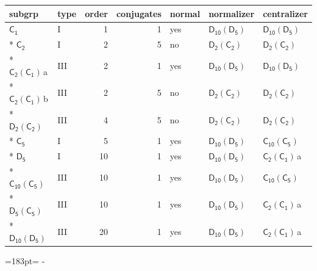 \documentclass[10pt,a4paper]{article}
\newcommand{\needspace}[1]{\par\penalty-100\begingroup\dimen0=#1\relax\dimen2=\pagegoal
  \advance\dimen2-\pagetotal\ifdim\dimen0>\dimen2\relax\ifdim\dimen2>0pt\vfil\break\fi\fi
  \endgroup}
\numberwithin{equation}{section}
\newcommand{\grp}[1]{\mathsf{#1}}
\newcommand{\clsletter}[1]{\,{\scriptsize\color{black!55}#1}}
\begin{document}
{\small\begin{longtable}{@{}llrrlll@{}}\toprule
subgrp & type & order & conjugates & normal & normalizer & centralizer\\\midrule\endhead
\bottomrule\endfoot\endlastfoot
\href{../../../rotation/data/pdf/C1.pdf}{$\grp{C_{1}}$} & I & 1 & 1 & yes & \href{D10-D5.pdf}{$\grp{D_{10}}(\grp{D_{5}})$} & \href{D10-D5.pdf}{$\grp{D_{10}}(\grp{D_{5}})$}\\*
\href{../../../rotation/data/pdf/C2.pdf}{$\grp{C_{2}}$} & I & 2 & 5 & no & \href{D2-C2.pdf}{$\grp{D_{2}}(\grp{C_{2}})$} & \href{D2-C2.pdf}{$\grp{D_{2}}(\grp{C_{2}})$}\\*
\href{C2-C1.pdf}{$\grp{C_{2}}(\grp{C_{1}})$}\clsletter{a} & III & 2 & 1 & yes & \href{D10-D5.pdf}{$\grp{D_{10}}(\grp{D_{5}})$} & \href{D10-D5.pdf}{$\grp{D_{10}}(\grp{D_{5}})$}\\*
\href{C2-C1.pdf}{$\grp{C_{2}}(\grp{C_{1}})$}\clsletter{b} & III & 2 & 5 & no & \href{D2-C2.pdf}{$\grp{D_{2}}(\grp{C_{2}})$} & \href{D2-C2.pdf}{$\grp{D_{2}}(\grp{C_{2}})$}\\*
\href{D2-C2.pdf}{$\grp{D_{2}}(\grp{C_{2}})$} & III & 4 & 5 & no & \href{D2-C2.pdf}{$\grp{D_{2}}(\grp{C_{2}})$} & \href{D2-C2.pdf}{$\grp{D_{2}}(\grp{C_{2}})$}\\*
\href{../../../rotation/data/pdf/C5.pdf}{$\grp{C_{5}}$} & I & 5 & 1 & yes & \href{D10-D5.pdf}{$\grp{D_{10}}(\grp{D_{5}})$} & \href{C10-C5.pdf}{$\grp{C_{10}}(\grp{C_{5}})$}\\*
\href{../../../rotation/data/pdf/D5.pdf}{$\grp{D_{5}}$} & I & 10 & 1 & yes & \href{D10-D5.pdf}{$\grp{D_{10}}(\grp{D_{5}})$} & \href{C2-C1.pdf}{$\grp{C_{2}}(\grp{C_{1}})$}\clsletter{a}\\*
\href{C10-C5.pdf}{$\grp{C_{10}}(\grp{C_{5}})$} & III & 10 & 1 & yes & \href{D10-D5.pdf}{$\grp{D_{10}}(\grp{D_{5}})$} & \href{C10-C5.pdf}{$\grp{C_{10}}(\grp{C_{5}})$}\\*
\href{D5-C5.pdf}{$\grp{D_{5}}(\grp{C_{5}})$} & III & 10 & 1 & yes & \href{D10-D5.pdf}{$\grp{D_{10}}(\grp{D_{5}})$} & \href{C2-C1.pdf}{$\grp{C_{2}}(\grp{C_{1}})$}\clsletter{a}\\*
\href{D10-D5.pdf}{$\grp{D_{10}}(\grp{D_{5}})$} & III & 20 & 1 & yes & \href{D10-D5.pdf}{$\grp{D_{10}}(\grp{D_{5}})$} & \href{C2-C1.pdf}{$\grp{C_{2}}(\grp{C_{1}})$}\clsletter{a}\\
\bottomrule\end{longtable}}
\needspace{183pt}
\end{document}
